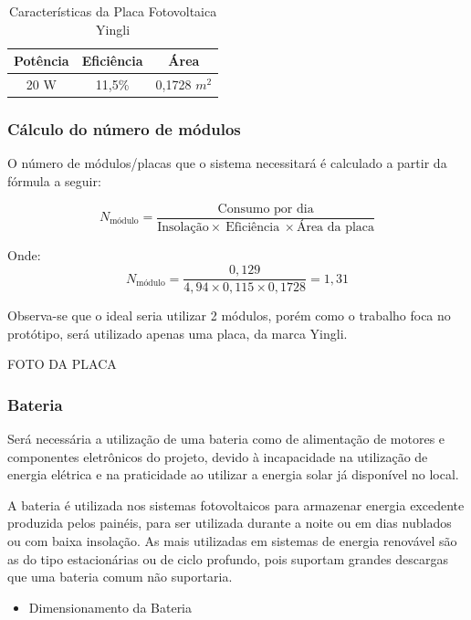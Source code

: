 \begin{table}[!ht]
\centering
\caption{Características da Placa Fotovoltaica Yingli}
\label{my-label}
\begin{tabular}{|c|c|c|}
\hline
\textbf{Potência} & \textbf{Eficiência} & \textbf{Área} \\ \hline
20 W & 11,5\% & 0,1728 $m^{2}$ \\ \hline
\end{tabular}
\end{table}

\subsubsection*{Cálculo do número de módulos}
O número de módulos/placas que o sistema necessitará é calculado a partir da fórmula a seguir:


\begin{equation}
N_{\text{módulo}}= \frac{\text{Consumo por dia}}{\text{Insolação}\times~\text{Eficiência}~\times\text{Área da placa}}
\end{equation}

Onde:
\begin{equation}
N_{\text{módulo}}= \frac{0,129}{4,94\times0,115\times0,1728} = 1,31
\end{equation}

Observa-se que o ideal seria utilizar 2 módulos, porém como o trabalho foca no protótipo, será utilizado apenas uma placa, da marca Yingli.

FOTO DA PLACA

\subsubsection{Bateria}

Será necessária a utilização de uma bateria como de alimentação de motores e componentes eletrônicos do projeto, devido à incapacidade na utilização de energia elétrica e na praticidade ao utilizar a energia solar já disponível no local.

A bateria é utilizada nos sistemas fotovoltaicos para armazenar energia excedente produzida pelos painéis, para ser utilizada durante a noite ou em dias nublados ou com baixa insolação. As mais utilizadas em sistemas de energia renovável são as do tipo estacionárias ou de ciclo profundo, pois suportam grandes descargas que uma bateria comum não suportaria.


\begin{itemize}
\item{Dimensionamento da Bateria}
\end{itemize}

